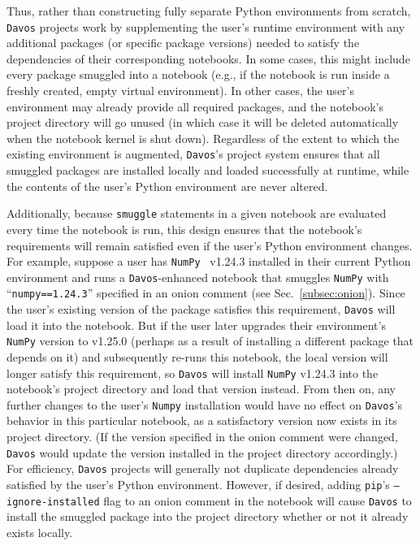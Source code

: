 \documentclass[preprint,12pt,a4paper]{elsarticle}
\begin{document}
Thus, rather than constructing fully separate Python environments from scratch, \texttt{Davos} projects work by supplementing the user's runtime environment with any additional packages (or specific package versions) needed to satisfy the dependencies of their corresponding notebooks.
In some cases, this might include every package smuggled into a notebook (e.g., if the notebook is run inside a freshly created, empty virtual environment).
In other cases, the user's environment may already provide all required packages, and the notebook's project directory will go unused (in which case it will be deleted automatically when the notebook kernel is shut down).
Regardless of the extent to which the existing environment is augmented, \texttt{Davos}'s project system ensures that all smuggled packages are installed locally and loaded successfully at runtime, while the contents of the user's Python environment are never altered.

Additionally, because \texttt{smuggle} statements in a given notebook are evaluated every time the notebook is run, this design ensures that the notebook's requirements will remain satisfied even if the user's Python environment changes.
For example, suppose a user has \texttt{NumPy}~\cite{HarrEtal20} v1.24.3 installed in their current Python environment and runs a \texttt{Davos}-enhanced notebook that smuggles \texttt{NumPy} with ``\texttt{numpy==1.24.3}'' specified in an onion comment (see Sec.~\ref{subsec:onion}).
Since the user's existing version of the package satisfies this requirement, \texttt{Davos} will load it into the notebook.
But if the user later upgrades their environment's \texttt{NumPy} version to v1.25.0 (perhaps as a result of installing a different package that depends on it) and subsequently re-runs this notebook, the local version will longer satisfy this requirement, so \texttt{Davos} will install \texttt{NumPy} v1.24.3 into the notebook's project directory and load that version instead.
From then on, any further changes to the user's \texttt{Numpy} installation would have no effect on \texttt{Davos}'s behavior in this particular notebook, as a satisfactory version now exists in its project directory.
(If the version specified in the onion comment were changed, \texttt{Davos} would update the version installed in the project directory accordingly.)
For efficiency, \texttt{Davos} projects will generally not duplicate dependencies already satisfied by the user's Python environment.
However, if desired, adding \texttt{pip}'s \texttt{--ignore-installed} flag to an onion comment in the notebook will cause \texttt{Davos} to install the smuggled package into the project directory whether or not it already exists locally.
\end{document}
